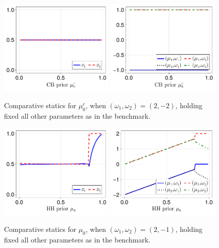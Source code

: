 \documentclass[12pt,a4paper]{article}
\begin{document}
\begin{figure}[H]
\centering
\includegraphics[width=0.49\textwidth]{figures/V8/γ_1/fig_optimal_π_across_μ_0_c_ω_1_2_ω_2_-2_δ_0.5_.pdf}
\includegraphics[width=0.49\textwidth]{figures/V8/γ_1/fig_posterior_across_μ_0_c_ω_1_2_ω_2_-2_δ_0.5_.pdf}
\caption{Comparative statics for $\mu_0^c$, when $(\omega_1,\omega_2)=(2,-2)$, holding fixed all other parameters as in the benchmark.}
\label{FigureA18}
\end{figure}

\begin{figure}[H]
\centering
\includegraphics[width=0.49\textwidth]{figures/V8/γ_1/fig_optimal_π_across_μ_0_ω_1_2_ω_2_-1_δ_0.5_.pdf}
\includegraphics[width=0.49\textwidth]{figures/V8/γ_1/fig_posterior_across_μ_0_ω_1_2_ω_2_-1_δ_0.5_.pdf}
\caption{Comparative statics for $\mu_0$, when $(\omega_1,\omega_2)=(2,-1)$, holding fixed all other parameters as in the benchmark.}
\label{FigureA19}
\end{figure}
\end{document}
